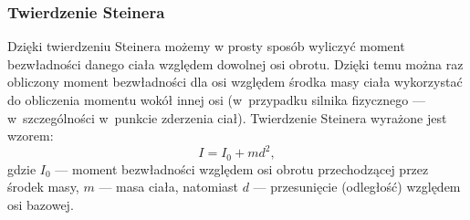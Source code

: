 \subsubsection*{Twierdzenie Steinera}
\label{part:twsteinera}
Dzięki twierdzeniu Steinera możemy w prosty sposób wyliczyć moment bezwładności danego ciała względem dowolnej osi obrotu. Dzięki temu można raz obliczony moment bezwładności dla osi względem środka masy ciała wykorzystać do obliczenia momentu wokół innej osi (w~przypadku silnika fizycznego --- w~szczególności w~punkcie zderzenia ciał).
Twierdzenie Steinera wyrażone jest wzorem:
\begin{equation}
I = I_0 + md^2,
\end{equation}
gdzie $I_0$ --- moment bezwładności względem osi obrotu przechodzącej przez środek masy, $m$ --- masa ciała, natomiast $d$ --- przesunięcie (odległość) względem osi bazowej.

